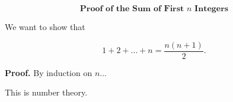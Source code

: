 $$
\textbf{Proof of the Sum of First $n$ Integers}
$$

We want to show that

\[
1 + 2 + \dots + n = \frac{n(n+1)}{2}.
\]

\textbf{Proof.}
By induction on $n$...

This is number theory.

